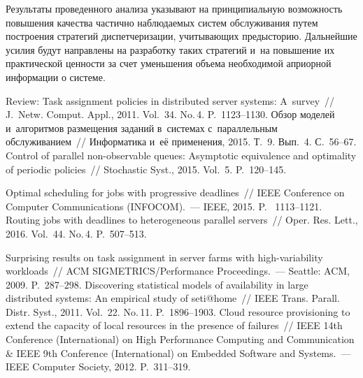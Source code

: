 \begin{multicols}{2}
    Результаты проведенного анализа указывают на принципиальную возможность 
повышения качества частично наблюдаемых систем обслуживания путем построения 
стратегий диспетчеризации, учитывающих предысторию. Дальнейшие усилия будут 
направлены на разработку таких стратегий и~на повышение их практической ценности за 
счет уменьшения объема необходимой априорной информации о системе.
    
{\small\frenchspacing
 {%
 \begin{thebibliography}{99}
    
    Review: Task 
assignment policies in distributed server systems: A~survey~// J.~Netw. Comput. 
Appl., 2011. Vol.~34. No.\,4. P.~1123--1130.
     Обзор моделей и~алгоритмов размещения 
заданий в~системах с~параллельным обслуживанием~// Информатика и~её применения, 
2015. Т.~9. Вып.~4. С.~56--67.
     Control of parallel non-observable queues: Asymptotic 
equivalence and optimality of periodic policies~// Stochastic Syst., 2015. Vol.~5.  
P.~120--145.
   
    
     Optimal scheduling for jobs with 
progressive deadlines~// IEEE Conference on Computer  
Communications (INFOCOM).~--- IEEE, 2015. P.~ 1113--1121.
     Routing jobs with deadlines to heterogeneous parallel 
servers~// Oper. Res. Lett., 2016. Vol.~44. No.\,4. P.~507--513.
    
     Surprising results on task 
assignment in server farms with high-variability workloads~// ACM SIGMETRICS/Performance 
Proceedings.~--- Seattle: ACM, 2009. P.~287--298.
     Discovering statistical models 
of availability in large distributed systems: An empirical study of seti@home~// IEEE Trans. 
Parall. Distr. Syst., 2011. Vol.~22. No.\,11. P.~1896--1903.
     Cloud resource provisioning to extend the 
capacity of local resources in the presence of failures~// IEEE 14th  Conference 
(International)  on High Performance Computing and Communication  \&  IEEE 
9th  Conference (International) on Embedded Software and Systems.~--- IEEE 
Computer Society, 2012. P.~311--319.
   

\end{thebibliography}}}
\end{multicols}
